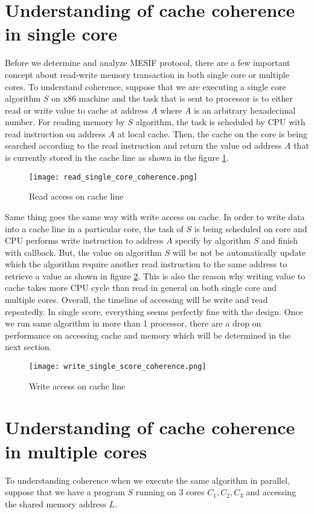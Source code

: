 \section{Understanding of cache coherence in single core}

Before we determine and analyze MESIF protocol, there are a few important concept
about read-write memory transaction in both single core or multiple cores. To understand
coherence, suppose that we are executing a single core algorithm $S$ on x86 machine and the task
that is sent to processor is to either read or write value to cache at address $A$ where $A$ is 
an arbitrary hexadecimal number. For reading memory by $S$ algorithm, the task is scheduled by CPU 
with read instruction on address $A$ at local cache. Then, the cache on the core is being searched according to
the read instruction and return the value od address $A$ that is currently stored in the cache line as shown in the
figure \ref{fig:read_single_core}.
\begin{figure}[h]
        \centering
        \texttt{[image: read\_single\_core\_coherence.png]}
        \caption{\label{fig:read_single_core} Read access on cache line}
\end{figure}

Same thing goes the same way with write access on cache. In order to write data into a cache line in a 
particular core, the task of $S$ is being scheduled on core and CPU performs write instruction to address $A$
specify by algorithm $S$ and finish with callback. But, the value on algorithm $S$ will be not be automatically 
update which the algorithm require another read instruction to the same address to retrieve a value as shown in 
figure \ref{fig:write_single_core}. This is also the reason why writing value to cache takes more CPU cycle than read 
in general on both single core and multiple cores. Overall, the timeline of accessing will be write and read repeatedly. 
In single score, everything seems perfectly fine with the design.
Once we run same algorithm in more than 1 processor, there are a drop on performance on accessing cache and memory which will
be determined in the next section.
\begin{figure}[h]
        \centering
        \texttt{[image: write\_single\_score\_coherence.png]}
        \caption{\label{fig:write_single_core} Write access on cache line}
\end{figure}

\section{Understanding of cache coherence in multiple cores}
To understanding coherence when we execute the same algorithm in parallel, suppose that we have 
a program $S$ running on 3 cores $C_1, C_2, C_3$ and accessing the shared memory address $L$.

